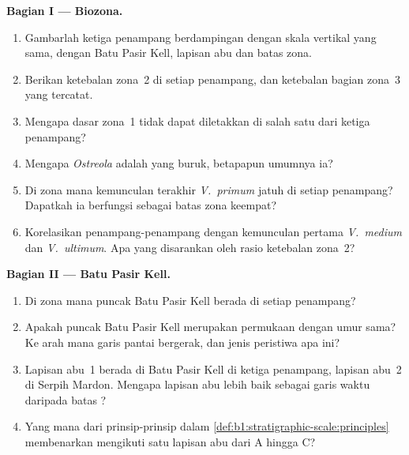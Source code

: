 \begin{problem}
\medskip
\noindent\textbf{Bagian I --- Biozona.}
\begin{enumerate}
  \item Gambarlah ketiga penampang berdampingan dengan skala vertikal yang sama, dengan Batu Pasir Kell, lapisan abu dan batas zona.
  \item Berikan ketebalan zona~2 di setiap penampang, dan ketebalan bagian zona~3 yang tercatat.
  \item Mengapa dasar zona~1 tidak dapat diletakkan di salah satu dari ketiga penampang?
  \item Mengapa \emph{Ostreola} adalah  yang buruk, betapapun umumnya ia?
  \item Di zona mana kemunculan terakhir \emph{V.~primum} jatuh di setiap penampang? Dapatkah ia berfungsi sebagai batas zona keempat?
  \item Korelasikan penampang-penampang dengan kemunculan pertama \emph{V.~medium} dan \emph{V.~ultimum}. Apa yang disarankan oleh rasio ketebalan zona~2?
\end{enumerate}

\noindent\textbf{Bagian II --- Batu Pasir Kell.}
\begin{enumerate}[resume]
  \item Di zona mana puncak Batu Pasir Kell berada di setiap penampang?
  \item Apakah puncak Batu Pasir Kell merupakan permukaan dengan umur sama? Ke arah mana garis pantai bergerak, dan jenis peristiwa apa ini?
  \item Lapisan abu~1 berada di Batu Pasir Kell di ketiga penampang, lapisan abu~2 di Serpih Mardon. Mengapa lapisan abu lebih baik sebagai garis waktu daripada batas ?
  \item Yang mana dari prinsip-prinsip dalam \cref{def:b1:stratigraphic-scale:principles} membenarkan mengikuti satu lapisan abu dari A hingga C?
\end{enumerate}


\end{problem}
